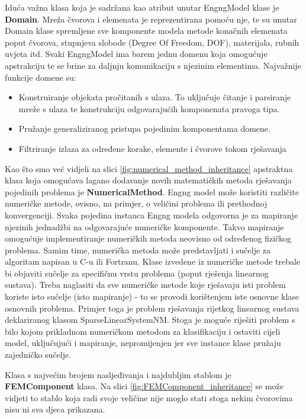 \documentclass[a4paper,twoside,12pt]{memoir} %
\begin{document}
\par
Iduća važna klasa koja je sadržana kao atribut unutar EngngModel klase je \textbf{Domain}. Mreža čvorova i elemenata je reprezentirana pomoću nje, te su unutar Domain klase spremljene sve komponente modela metode konačnih elemenata poput čvorova, stupnjeva slobode (Degree Of Freedom, DOF), materijala, rubnih uvjeta itd. Svaki EngngModel ima barem jednu domenu koja omogućuje apstrakciju te se brine za daljnju komunikaciju s njezinim elementima. Najvažnije funkcije domene su:
\begin{itemize}
    \item Konstruiranje objekata pročitanih s ulaza. To uključuje čitanje i parsiranje mreže s ulaza te konstrukciju odgovarajućih komponenata pravoga tipa.
    \item Pružanje generaliziranog pristupa pojedinim komponentama domene.
    \item Filtriranje izlaza za određene korake, elemente i čvorove tokom rješavanja
\end{itemize}

\par

Kao što smo već vidjeli na slici \ref{fig:numerical_method_inheritance} apstraktna klasa koja omogućava lagano dodavanje novih matematičkih metoda rješavanja pojedinih problema je \textbf{NumericalMethod}. Engng model može koristiti različite numeričke metode, ovisno, na primjer, o veličini problema ili prethodnoj konvergenciji. Svaka pojedina instanca Engng modela odgovorna je za mapiranje njezinih jednadžbi na odgovarajuće numeričke komponente. Takvo mapiranje omogućuje implementiranje numeričkih metoda neovisno od određenog fizičkog problema. Samim time, numerička metoda može predstavljati i sučelje za algoritam napisan u C-u ili Fortranu. Klase izvedene iz numeričke metode trebale bi objaviti sučelje za specifičnu vrstu problema (poput rješenja linearnog sustava). Treba naglasiti da sve numeričke metode koje rješavaju isti problem koriste isto sučelje (isto mapiranje) - to se provodi korištenjem iste osnovne klase osnovnih problema. Primjer toga je problem rješavanja rijetkog linearnog sustava deklariranog klasom SparseLinearSystemNM. Stoga je moguće riješiti problem s bilo kojom prikladnom numeričkom metodom za klasifikaciju i ostaviti cijeli model, uključujući i mapiranje, nepromijenjen jer sve instance klase pružaju zajedničko sučelje. \par

Klasa s najvećim brojem nasljeđivanja i najdubljim stablom je \textbf{FEMComponent} klasa. Na slici \ref{fig:FEMComponent_inheritance} se može vidjeti to stablo koja radi svoje veličine nije moglo stati stoga nekim čvorovima nisu ni sva djeca prikazana.
\end{document}
